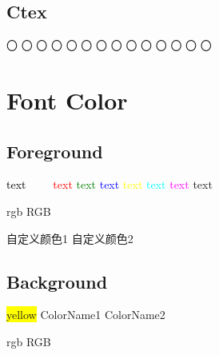 \documentclass[UTF8]{ctexrep}
\begin{document}
\subsection{Ctex}
\par
{ 〇}
{ 〇}
{ 〇}
{ 〇}
{ 〇}
{ 〇}
{ 〇}
{ 〇}
{ 〇}
{ 〇}
{ 〇}
{ 〇}
{ 〇}
{ 〇}


\section{Font Color}

\subsection{Foreground}
\par
\textcolor{black}{text}
\textcolor{white}{text}
\textcolor{red}{text}
\textcolor{green}{text}
\textcolor{blue}{text}
\textcolor{yellow}{text}
\textcolor{cyan}{text}
\textcolor{magenta}{text}
{\color{magenta} text}
\par
\textcolor[rgb]{0.7,0.6,0.3}{rgb}
\textcolor[RGB]{22,200,33}{RGB}
\par
\textcolor{ColorName1}{自定义颜色1}
\textcolor{ColorName2}{自定义颜色2}

\subsection{Background}
\par
\colorbox{yellow}{yellow}
\colorbox{ColorName1}{ColorName1}
\colorbox{ColorName2}{ColorName2}
\par
\colorbox[rgb]{0.4,0.4,0.7}{rgb}
\colorbox[RGB]{200,32,68}{RGB}
\end{document}
